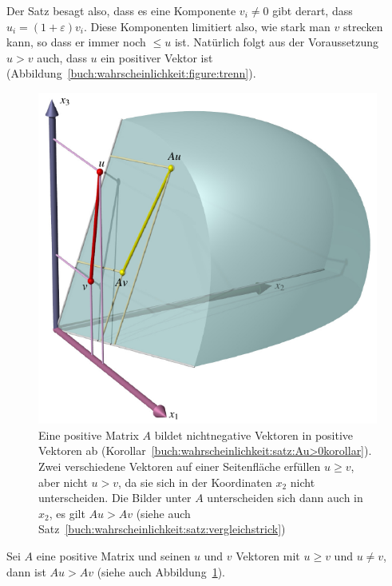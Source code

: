 Der Satz besagt also, dass es eine Komponente $v_i\ne 0$ gibt
derart, dass $u_i = (1+\varepsilon)v_i$.
Diese Komponenten limitiert also, wie stark man $v$ strecken kann,
so dass er immer noch $\le u$ ist.
Natürlich folgt aus der Voraussetzung $u>v$ auch, dass $u$ ein 
positiver Vektor ist (Abbildung~\ref{buch:wahrscheinlichkeit:figure:trenn}).

\begin{figure}
\centering
\includegraphics{chapters/80-wahrscheinlichkeit/images/vergleich.pdf}
\caption{Eine positive Matrix $A$ bildet nichtnegative Vektoren in
positive Vektoren ab
(Korollar~\ref{buch:wahrscheinlichkeit:satz:Au>0korollar}).
Zwei verschiedene Vektoren auf einer Seitenfläche erfüllen $u\ge v$,
aber nicht $u>v$, da sie sich in der Koordinaten $x_2$ nicht unterscheiden.
Die Bilder unter $A$ unterscheiden sich dann auch in $x_2$, es gilt
$Au>Av$ (siehe auch Satz~\ref{buch:wahrscheinlichkeit:satz:vergleichstrick})
\label{buch:wahrscheinlichkeit:fig:vergleich}}
\end{figure}

\begin{satz}[Vergleichstrick]
\label{buch:wahrscheinlichkeit:satz:vergleichstrick}
%
Sei $A$ eine positive Matrix und seinen $u$ und $v$ Vektoren
mit $u\ge v$ und $u\ne v$, dann ist $Au > Av$
(siehe auch Abbildung~\ref{buch:wahrscheinlichkeit:fig:vergleich}).
\end{satz}

